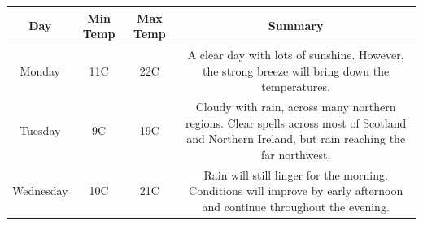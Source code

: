 	\begin{center}
		\begin{tabular}{ | c | c | c | c |}
		\hline
		Day & Min Temp & Max Temp & Summary \\ \hline
		Monday & 11C & 22C & A clear day with lots of sunshine.  
		However, the strong breeze will bring down the temperatures. \\ \hline
		Tuesday & 9C & 19C & Cloudy with rain, across many northern regions. Clear spells
		across most of Scotland and Northern Ireland,
		but rain reaching the far northwest. \\ \hline
		Wednesday & 10C & 21C & Rain will still linger for the morning.
		Conditions will improve by early afternoon and continue
		throughout the evening. \\
		\hline
		\end{tabular}
	\end{center}



